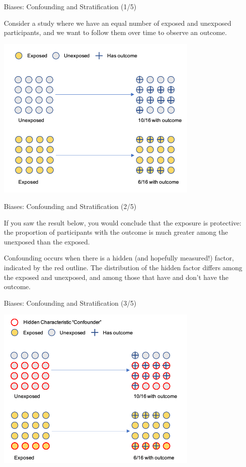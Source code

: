 \documentclass[ignorenonframetext,]{beamer}
\begin{document}
\begin{frame}{Biases: Confounding and Stratification (1/5)}
\protect\hypertarget{biases-confounding-and-stratification-15}{}

Consider a study where we have an equal number of exposed and unexposed
participants, and we want to follow them over time to observe an
outcome.

\includegraphics[width=0.75\textwidth,height=\textheight]{../media/confounder-1.png}

\end{frame}

\begin{frame}{Biases: Confounding and Stratification (2/5)}
\protect\hypertarget{biases-confounding-and-stratification-25}{}

If you saw the result below, you would conclude that the exposure is
protective: the proportion of participants with the outcome is much
greater among the unexposed than the exposed.

Confounding occurs when there is a hidden (and hopefully measured!)
factor, indicated by the red outline. The distribution of the hidden
factor differs among the exposed and unexposed, and among those that
have and don't have the outcome.

\end{frame}

\begin{frame}{Biases: Confounding and Stratification (3/5)}
\protect\hypertarget{biases-confounding-and-stratification-35}{}

\includegraphics[width=0.75\textwidth,height=\textheight]{../media/confounder-2.png}

\end{frame}
\end{document}
